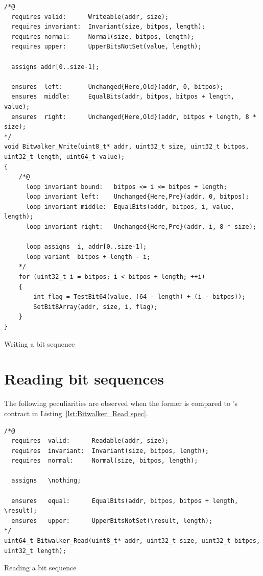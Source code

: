\begin{listing}[hbt]
\begin{minipage}{0.99\textwidth}
\begin{lstlisting}[style=acsl-block]
/*@
  requires valid:      Writeable(addr, size);
  requires invariant:  Invariant(size, bitpos, length);
  requires normal:     Normal(size, bitpos, length);
  requires upper:      UpperBitsNotSet(value, length);

  assigns addr[0..size-1];

  ensures  left:       Unchanged{Here,Old}(addr, 0, bitpos);
  ensures  middle:     EqualBits(addr, bitpos, bitpos + length, value);
  ensures  right:      Unchanged{Here,Old}(addr, bitpos + length, 8 * size);
*/
void Bitwalker_Write(uint8_t* addr, uint32_t size, uint32_t bitpos, uint32_t length, uint64_t value);
{
    /*@
      loop invariant bound:   bitpos <= i <= bitpos + length;
      loop invariant left:    Unchanged{Here,Pre}(addr, 0, bitpos);
      loop invariant middle:  EqualBits(addr, bitpos, i, value, length);
      loop invariant right:   Unchanged{Here,Pre}(addr, i, 8 * size);

      loop assigns  i, addr[0..size-1];
      loop variant  bitpos + length - i;
    */
    for (uint32_t i = bitpos; i < bitpos + length; ++i)
    {
        int flag = TestBit64(value, (64 - length) + (i - bitpos));
        SetBit8Array(addr, size, i, flag);
    }   
}

\end{lstlisting}
\end{minipage}
\caption{\label{Bitwalker_Write spec}Writing a bit sequence}
\end{listing}

\FloatBarrier

\section{Reading bit sequences}
\label{sec:reading bit sequences}

The following peculiarities are observed when the former is
compared to 's contract in Listing~\ref{lst:Bitwalker_Read spec}.

\begin{listing}[hbt]
\begin{minipage}{0.99\textwidth}
\begin{lstlisting}[style=acsl-block]
/*@
  requires  valid:      Readable(addr, size);
  requires  invariant:  Invariant(size, bitpos, length);
  requires  normal:     Normal(size, bitpos, length);

  assigns   \nothing;

  ensures   equal:      EqualBits(addr, bitpos, bitpos + length, \result);
  ensures   upper:      UpperBitsNotSet(\result, length);
*/
uint64_t Bitwalker_Read(uint8_t* addr, uint32_t size, uint32_t bitpos, uint32_t length);
\end{lstlisting}
\end{minipage}
\caption{\label{lst:Bitwalker_Read spec}Reading a bit sequence}
\end{listing}


